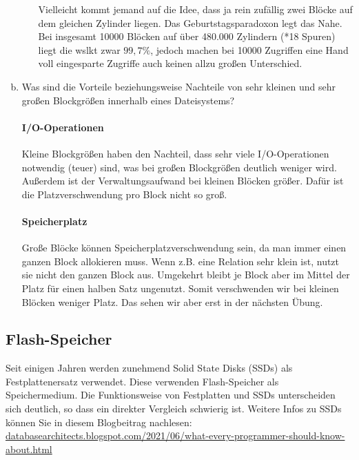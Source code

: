 \begin{enumerate}[a)]
\begin{enumerate}[i)]
		\begin{note}
		Vielleicht kommt jemand auf die Idee, dass ja rein zufällig zwei Blöcke auf dem gleichen Zylinder liegen.
		Das Geburtstagsparadoxon legt das Nahe.
		Bei insgesamt 10000 Blöcken auf über 480.000 Zylindern (*18 Spuren) liegt die wslkt zwar $99,7\% $, jedoch machen bei 10000 Zugriffen eine Hand voll eingesparte Zugriffe auch keinen allzu großen Unterschied.
		\end{note}

	\end{enumerate}


	\item Was sind die Vorteile beziehungsweise Nachteile von sehr kleinen und sehr großen Blockgrößen innerhalb eines Dateisystems?

	\begin{solution}
	\paragraph{I/O-Operationen}
	Kleine Blockgrößen haben den Nachteil, dass sehr viele I/O-Operationen notwendig (teuer) sind, was bei großen Blockgrößen deutlich weniger wird.
	Außerdem ist der Verwaltungsaufwand bei kleinen Blöcken größer.
	Dafür ist die Platzverschwendung pro Block nicht so groß.

	\paragraph{Speicherplatz}
	Große Blöcke können Speicherplatzverschwendung sein, da man immer einen ganzen Block allokieren muss.
	Wenn z.B. eine Relation sehr klein ist, nutzt sie nicht den ganzen Block aus.
	Umgekehrt bleibt je Block aber im Mittel der Platz für einen halben Satz ungenutzt.
	Somit verschwenden wir bei kleinen Blöcken weniger Platz.
	Das sehen wir aber erst in der nächsten Übung.
	\end{solution}
\end{enumerate}

\subsection{Flash-Speicher}
Seit einigen Jahren werden zunehmend Solid State Disks (SSDs) als Festplattenersatz verwendet.
Diese verwenden Flash-Speicher als Speichermedium.
Die Funktionsweise von Festplatten und SSDs unterscheiden sich deutlich, so dass ein direkter Vergleich schwierig ist.
Weitere Infos zu SSDs können Sie in diesem Blogbeitrag nachlesen: \href{http://databasearchitects.blogspot.com/2021/06/what-every-programmer-should-know-about.html}{databasearchitects.blogspot.com/2021/06/what-every-programmer-should-know-about.html}

